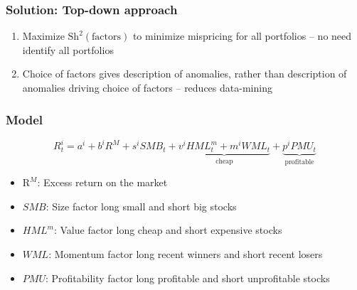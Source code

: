 \documentclass[notes]{beamer}  %
\begin{document}
\begin{frame} \frametitle{Solution: Top-down approach}
  \begin{enumerate}
    \item Maximize $\text{Sh}^2(\text{factors})$ to minimize mispricing for all portfolios -- no need identify all portfolios\\
    \item Choice of factors gives description of anomalies, rather than description of anomalies driving choice of factors -- reduces data-mining
  \end{enumerate}
\end{frame}

\begin{frame} \frametitle{Model}
  \begin{equation} \label{eq:B16}
    R_t^i = a^i+b^iR^M+s^iSMB_t+
    \underbrace{v^iHML_t^m+m^iWML_t}_\text{cheap}+
    \underbrace{p^iPMU_t}_\text{profitable}
  \end{equation}
  \begin{itemize}
    \item $\text{R}^M$: Excess return on the market
    \item $SMB$: Size factor long small and short big stocks
    \item $HML^m$: Value factor long cheap and short expensive stocks
    \item $WML$: Momentum factor long recent winners and short recent losers
    \item $PMU$: Profitability factor long profitable and short unprofitable stocks
  \end{itemize}
\end{frame}

\end{document}

